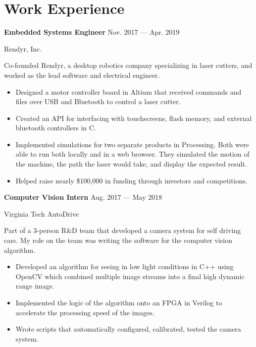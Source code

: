 \section{Work Experience}

\parbox[t][][t]{\linewidth}{
	\parbox{\linewidth}{\textbf{Embedded Systems Engineer}
		\hfill {{Nov. 2017 --- Apr. 2019}}}
	\smallbreak
	\parbox{\linewidth}{Rendyr, Inc.}
	
	\bigskip
	
	Co-founded Rendyr, a desktop robotics company specializing in laser cutters, and worked as the lead software and electrical engineer.
	
	\bigskip
	\begin{itemize}
		
		\item{Designed a motor controller board in Altium that received commands and files over USB and Bluetooth to control a laser cutter.}\\[-.6em]
		
		\item{Created an API for interfacing with touchscreens, flash memory, and external bluetooth controllers in C.}\\[-.6em]
		
		\item{Implemented simulations for two separate products in Processing. Both were able to run both locally and in a web browser. They simulated the motion of the machine, the path the laser would take, and display the expected result.}\\[-.6em]
		
		\item{Helped raise nearly \$100,000 in funding through investors and competitions.}
		
	\end{itemize}
	\bigskip
	\bigskip
}

\parbox[t][][t]{\linewidth}{
	\parbox{\linewidth}{\textbf{Computer Vision Intern}
		\hfill {{Aug. 2017 --- May 2018}}}
	\smallbreak
	\parbox{\linewidth}{Virginia Tech AutoDrive}
	
	\bigskip
	
	Part of a 3-person R\&D team that developed a camera system for self driving cars. My role on the team was writing the software for the computer vision algorithm.
	
	\bigskip
	\begin{itemize}
		\item{Developed an algorithm for seeing in low light conditions in C++ using OpenCV which combined multiple image streams into a final high dynamic range image.}\\[-.6em]
		
		\item{Implemented the logic of the algorithm onto an FPGA in Verilog to accelerate the processing speed of the images.}\\[-.6em]
		
		\item{Wrote scripts that automatically configured, calibrated, tested the camera system.}
		
	\end{itemize}
	\bigskip
	\bigskip
}

